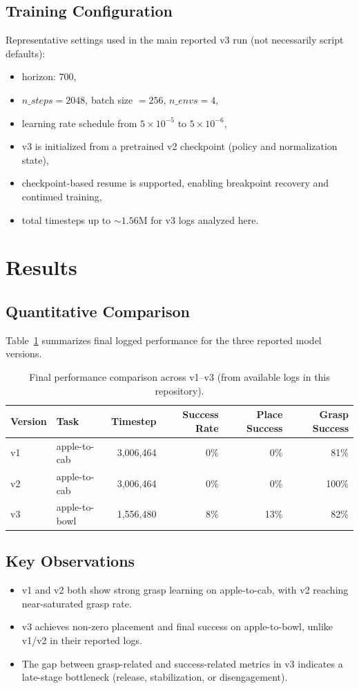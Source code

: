 \documentclass[11pt]{article}
\begin{document}
\subsection{Training Configuration}
Representative settings used in the main reported v3 run (not necessarily script
defaults):
\begin{itemize}
  \item horizon: $700$,
  \item $n\_steps = 2048$, batch size $= 256$, $n\_envs = 4$,
  \item learning rate schedule from $5\times 10^{-5}$ to $5\times 10^{-6}$,
  \item v3 is initialized from a pretrained v2 checkpoint (policy and
    normalization state),
  \item checkpoint-based resume is supported, enabling breakpoint recovery and
    continued training,
  \item total timesteps up to $\sim 1.56\text{M}$ for v3 logs analyzed here.
\end{itemize}

\section{Results}

\subsection{Quantitative Comparison}
Table~\ref{tab:results} summarizes final logged performance for the three
reported model versions.

\begin{table}[h]
\centering
\caption{Final performance comparison across v1--v3 (from available logs in this repository).}
\label{tab:results}
\begin{tabular}{llrrrr}
\toprule
Version & Task & Timestep & Success Rate & Place Success & Grasp Success \\
\midrule
v1 & apple-to-cab  & 3{,}006{,}464 & 0\%  & 0\%  & 81\%  \\
v2 & apple-to-cab  & 3{,}006{,}464 & 0\%  & 0\%  & 100\% \\
v3 & apple-to-bowl & 1{,}556{,}480 & 8\%  & 13\% & 82\%  \\
\bottomrule
\end{tabular}
\end{table}

\subsection{Key Observations}
\begin{itemize}
  \item v1 and v2 both show strong grasp learning on apple-to-cab, with v2
    reaching near-saturated grasp rate.
  \item v3 achieves non-zero placement and final success on apple-to-bowl,
    unlike v1/v2 in their reported logs.
  \item The gap between grasp-related and success-related metrics in v3
    indicates a late-stage bottleneck (release, stabilization, or
    disengagement).
\end{itemize}
\end{document}
